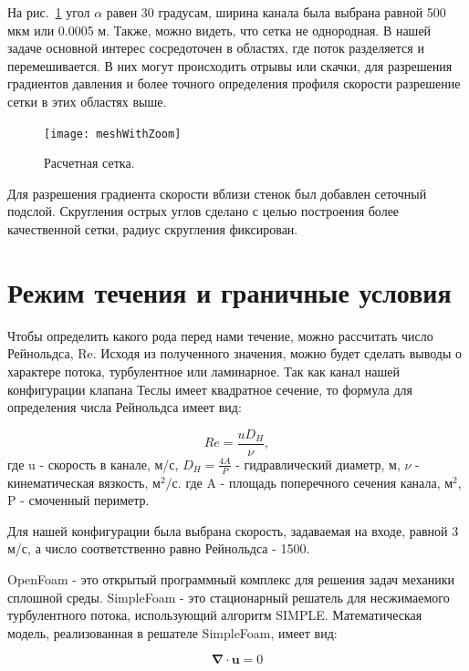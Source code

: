 \documentclass[10pt,a4paper]{book}
\begin{document}
    На рис.~\ref{fig:teslaMesh2} угол $\alpha$ равен 30 градусам, ширина канала была выбрана равной 500 мкм или 0.0005 м. Также, можно видеть, что сетка не однородная. В нашей задаче основной интерес сосредоточен в областях, где поток разделяется и перемешивается. В них могут происходить отрывы или скачки, для разрешения градиентов давления и более точного определения профиля скорости разрешение сетки в этих областях выше.
    
    \begin{figure}[H]
        \centering
        \texttt{[image: meshWithZoom]}
        \caption{Расчетная сетка.}
        \label{fig:teslaMesh2}
    \end{figure}   
    
    Для разрешения градиента скорости вблизи стенок был добавлен сеточный подслой. Скругления острых углов сделано с целью построения более качественной сетки, радиус скругления фиксирован.
    
    \section{Режим течения и граничные условия}        
    
    Чтобы определить какого рода перед нами течение, можно рассчитать число Рейнольдса, Re. Исходя из полученного значения, можно будет сделать выводы о характере потока, турбулентное или ламинарное.
    Так как канал нашей конфигурации клапана Теслы имеет квадратное сечение, то формула для определения числа Рейнольдса имеет вид:
    
    \begin{equation}\label{eqn:Re}
        Re = \frac{u D_{H}}{\nu},
    \end{equation}            
    где  u - скорость в канале, м/с, $ D_{H} = \frac{4A}{P} $ - гидравлический диаметр, м, $\nu$ - кинематическая вязкость, м$^{2}/$с. 
    где A - площадь поперечного сечения канала, м$^{2}$, P - смоченный периметр. 
    
    Для нашей конфигурации была выбрана скорость, задаваемая на входе, равной 3 м/с, а число соответственно равно Рейнольдса - 1500.
    
    OpenFoam - это открытый программный комплекс для решения задач механики сплошной среды. SimpleFoam - это стационарный решатель для несжимаемого турбулентного потока, использующий алгоритм SIMPLE. Математическая модель, реализованная в решателе SimpleFoam, имеет вид:
    
    \begin{equation}\label{eqn:simpleFoam}
        \bm{\nabla} \cdot \bm{u} = 0
    \end{equation} 
    
\end{document}
